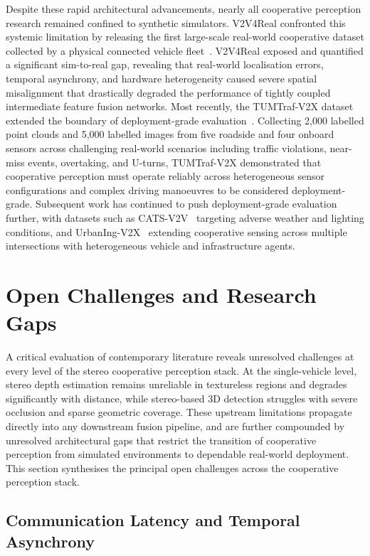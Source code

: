 Despite these rapid architectural advancements, nearly all cooperative perception
research remained confined to synthetic simulators. V2V4Real confronted this
systemic limitation by releasing the first large-scale real-world cooperative
dataset collected by a physical connected vehicle fleet~\cite{xu2023v2v4real}.
V2V4Real exposed and quantified a significant sim-to-real gap, revealing that
real-world localisation errors, temporal asynchrony, and hardware heterogeneity
caused severe spatial misalignment that drastically degraded the performance of
tightly coupled intermediate feature fusion networks. Most recently, the
TUMTraf-V2X dataset extended the boundary of deployment-grade
evaluation~\cite{zimmer2024}. Collecting 2,000 labelled point clouds and 5,000
labelled images from five roadside and four onboard sensors across challenging
real-world scenarios including traffic violations, near-miss events, overtaking,
and U-turns, TUMTraf-V2X demonstrated that cooperative perception must operate
reliably across heterogeneous sensor configurations and complex driving manoeuvres
to be considered deployment-grade. Subsequent work has continued to push
deployment-grade evaluation further, with datasets such as
CATS-V2V~\cite{li2025catsv2v} targeting adverse weather and lighting conditions,
and UrbanIng-V2X~\cite{sekaran2025urbaningv2x} extending cooperative sensing
across multiple intersections with heterogeneous vehicle and infrastructure
agents.

\section{Open Challenges and Research Gaps}
\label{sec:gaps}

A critical evaluation of contemporary literature reveals unresolved challenges at
every level of the stereo cooperative perception stack. At the single-vehicle
level, stereo depth estimation remains unreliable in textureless regions and
degrades significantly with distance, while stereo-based 3D detection struggles
with severe occlusion and sparse geometric coverage. These upstream limitations
propagate directly into any downstream fusion pipeline, and are further compounded
by unresolved architectural gaps that restrict the transition of cooperative
perception from simulated environments to dependable real-world deployment. This
section synthesises the principal open challenges across the cooperative
perception stack.

\subsection{Communication Latency and Temporal Asynchrony}

